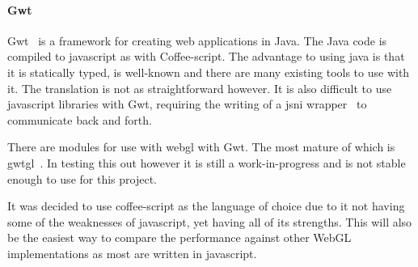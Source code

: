 \documentclass[12pt]{article}
\begin{document}
\paragraph{Gwt}
Gwt~\cite{web:gwt} is a framework for creating web applications in Java.
The Java code is compiled to javascript as with Coffee-script.
The advantage to using java is that it is statically typed, is well-known and there are many existing tools to use with it.
The translation is not as straightforward however.
It is also difficult to use javascript libraries with Gwt, requiring the writing of a jsni wrapper~\cite{web:jsni} to communicate back and forth.

There are modules for use with webgl with Gwt.
The most mature of which is gwtgl~\cite{web:gwtgl}.
In testing this out however it is still a work-in-progress and is not stable enough to use for this project.


It was decided to use coffee-script as the language of choice due to it not having some of the weaknesses of javascript, yet having all of its strengths.
This will also be the easiest way to compare the performance against other WebGL implementations as most are written in javascript.



\end{document}

